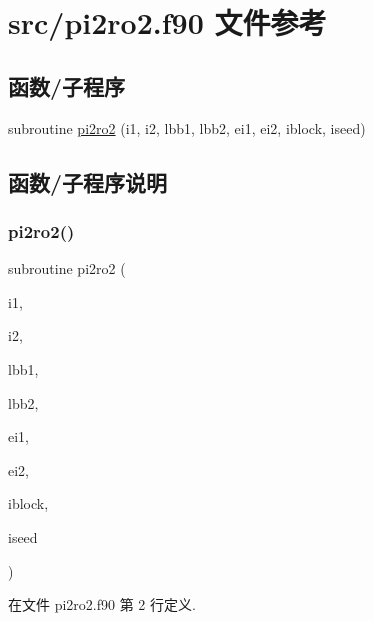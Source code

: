 \hypertarget{pi2ro2_8f90}{}\section{src/pi2ro2.f90 文件参考}
\label{pi2ro2_8f90}
\subsection*{函数/子程序}
\begin{DoxyCompactItemize}
\item 
subroutine \mbox{\hyperlink{pi2ro2_8f90_a54734b9fb10eb3327271503592dfa464}{pi2ro2}} (i1, i2, lbb1, lbb2, ei1, ei2, iblock, iseed)
\end{DoxyCompactItemize}


\subsection{函数/子程序说明}
\mbox{\label{pi2ro2_8f90_a54734b9fb10eb3327271503592dfa464}} 
\subsubsection{\texorpdfstring{pi2ro2()}{pi2ro2()}}
{\footnotesize\ttfamily subroutine pi2ro2 (\begin{DoxyParamCaption}\item[{}]{i1,  }\item[{}]{i2,  }\item[{}]{lbb1,  }\item[{}]{lbb2,  }\item[{}]{ei1,  }\item[{}]{ei2,  }\item[{}]{iblock,  }\item[{}]{iseed }\end{DoxyParamCaption})}



在文件 pi2ro2.\+f90 第 2 行定义.

